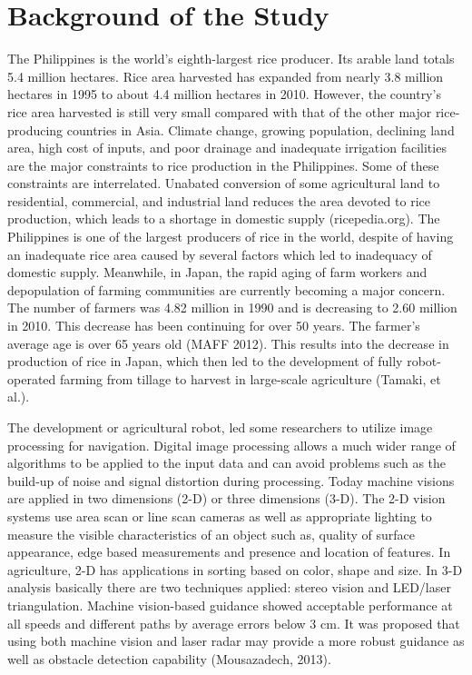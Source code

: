 \section{Background of the Study}

The Philippines is the world’s eighth-largest rice producer. Its arable land totals 5.4 million hectares. Rice area harvested has expanded from nearly 3.8 million hectares in 1995 to about 4.4 million hectares in 2010. However, the country’s rice area harvested is still very small compared with that of the other major rice-producing countries in Asia. Climate change, growing population, declining land area, high cost of inputs, and poor drainage and inadequate irrigation facilities are the major constraints to rice production in the Philippines. Some of these constraints are interrelated. Unabated conversion of some agricultural land to residential, commercial, and industrial land reduces the area devoted to rice production, which leads to a shortage in domestic supply (ricepedia.org). The Philippines is one of the largest producers of rice in the world, despite of having an inadequate rice area caused by several factors which led to inadequacy of domestic supply.  Meanwhile, in Japan, the rapid aging of farm workers and depopulation of farming communities are currently becoming a major concern. The number of farmers was 4.82 million in 1990 and is decreasing to 2.60 million in 2010. This decrease has been continuing for over 50 years. The farmer's average age is over 65 years old (MAFF 2012). This results into the decrease in production of rice in Japan, which then led to the development of fully robot-operated farming from tillage to harvest in large-scale agriculture (Tamaki, et al.).
	
The development or agricultural robot, led some researchers to utilize image processing for navigation. Digital image processing allows a much wider range of algorithms to be applied to the input data and can avoid problems such as the build-up of noise and signal distortion during processing. Today machine visions are applied in two dimensions (2-D) or three dimensions (3-D). The 2-D vision systems use area scan or line scan cameras as well as appropriate lighting to measure the visible characteristics of an object such as, quality of surface appearance, edge based measurements and presence and location of features. In agriculture, 2-D has applications in sorting based on color, shape and size. In 3-D analysis basically there are two techniques applied: stereo vision and LED/laser triangulation. Machine vision-based guidance showed acceptable performance at all speeds and different paths by average errors below 3 cm. It was proposed that using both machine vision and laser radar may provide a more robust guidance as well as obstacle detection capability (Mousazadech, 2013).

